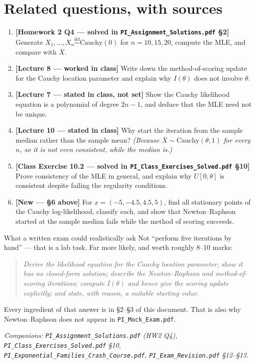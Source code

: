 \documentclass[11pt]{article}
\newcommand{\Xbar}{\overline{X}}
\newcommand{\iid}{\overset{\text{iid}}{\sim}}
\begin{document}
\section{Related questions, with sources}

\begin{enumerate}[label=\textbf{Q\arabic*.}]
\item \textbf{[Homework 2 Q4 --- solved in \texttt{PI\_Assignment\_Solutions.pdf} \S2]}
Generate $X_1,\dots,X_n\iid\mathrm{Cauchy}(0)$ for $n=10,15,20$, compute the MLE, and compare
with $\Xbar$.

\item \textbf{[Lecture 8 --- worked in class]} Write down the method-of-scoring update for the
Cauchy location parameter and explain why $I(\theta)$ does not involve $\theta$.

\item \textbf{[Lecture 7 --- stated in class, not set]} Show the Cauchy likelihood equation is
a polynomial of degree $2n-1$, and deduce that the MLE need not be unique.

\item \textbf{[Lecture 10 --- stated in class]} Why start the iteration from the sample median
rather than the sample mean? \emph{(Because $\Xbar\sim\mathrm{Cauchy}(\theta,1)$ for every $n$,
so it is not even consistent, while the median is.)}

\item \textbf{[Class Exercise 10.2 --- solved in
\texttt{PI\_Class\_Exercises\_Solved.pdf} \S10]} Prove consistency of the MLE in general, and
explain why $U[0,\theta]$ is consistent despite failing the regularity conditions.

\item \textbf{[New --- \S6 above]} For $x=(-5,-4.5,4.5,5)$, find all stationary points of the
Cauchy log-likelihood, classify each, and show that Newton--Raphson started at the sample
median fails while the method of scoring succeeds.
\end{enumerate}

\begin{idea}{What a written exam could realistically ask}
Not ``perform five iterations by hand'' --- that is a lab task. Far more likely, and worth
roughly 8--10 marks:
\begin{quote}
\emph{Derive the likelihood equation for the Cauchy location parameter; show it has no
closed-form solution; describe the Newton--Raphson and method-of-scoring iterations; compute
$I(\theta)$ and hence give the scoring update explicitly; and state, with reason, a suitable
starting value.}
\end{quote}
Every ingredient of that answer is in \S2--\S3 of this document. That is also why
Newton--Raphson does not appear in \texttt{PI\_Mock\_Exam.pdf}.
\end{idea}

\vfill
\begin{center}
\small\itshape
Companions: \texttt{PI\_Assignment\_Solutions.pdf} (HW2 Q4),
\texttt{PI\_Class\_Exercises\_Solved.pdf} \S10,
\texttt{PI\_Exponential\_Families\_Crash\_Course.pdf},
\texttt{PI\_Exam\_Revision.pdf} \S12--\S13.
\end{center}
\end{document}
